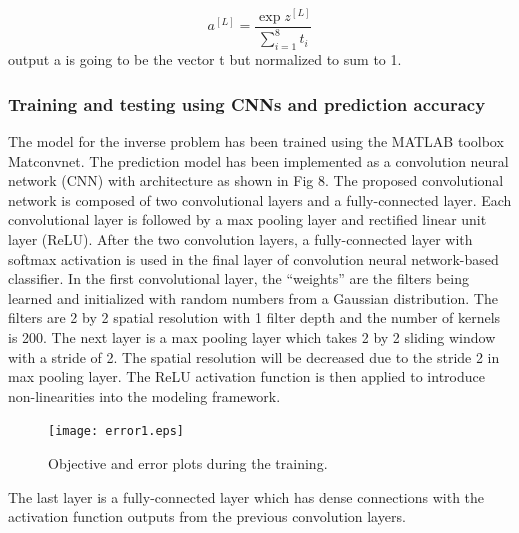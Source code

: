\begin{equation}
a^{[L]} = \frac{\exp z^{[L]}}{\sum_{i=1}^{8} t_i} 
\end{equation}
output a is going to be the vector t but normalized to sum to 1.



\subsubsection{Training and testing using CNNs and prediction accuracy}
\label{subsubsec3}

The model for the inverse problem has been trained using the MATLAB toolbox Matconvnet.
The prediction model has been implemented as a convolution neural network (CNN) with architecture as shown in Fig 8.
The proposed convolutional network is composed of two convolutional layers and a fully-connected layer.
Each convolutional layer is followed by a max pooling layer and rectified linear unit layer (ReLU).
After the two convolution layers, a fully-connected layer with softmax activation is used in the final layer of convolution neural network-based classifier.
In the first convolutional layer, the “weights” are the filters being learned and initialized with random numbers from a Gaussian distribution.
The filters are 2 by 2 spatial resolution with 1 filter depth and the number of kernels is 200.
The next layer is a max pooling layer which takes 2 by 2 sliding window with a stride of 2.
The spatial resolution will be decreased due to the stride 2 in max pooling layer.
The ReLU activation function is then applied to introduce non-linearities into the modeling framework.
\label{subsubsec3}
\begin{figure}
\centering
\texttt{[image: error1.eps]}
\caption{Objective and error plots during the training.}
\label{fig:5}       
\end{figure}
The last layer is a fully-connected layer which has dense connections with the activation function outputs from the previous convolution layers.
